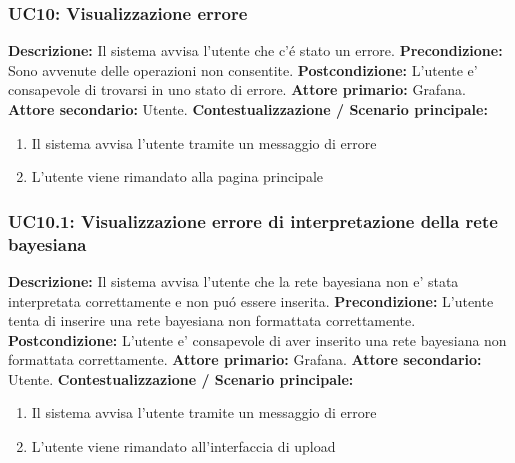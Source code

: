                 \subsubsection{UC10: Visualizzazione errore}
                    \textbf{Descrizione:}  Il sistema avvisa l’utente che c’é stato un errore.
                    \newline
                    \textbf{Precondizione:} Sono avvenute delle operazioni non consentite.
                    \newline
                    \textbf{Postcondizione:} L’utente e’ consapevole di trovarsi in uno stato di errore.
                    \newline
                    \textbf{Attore primario:} Grafana.
                    \newline
                    \textbf{Attore secondario:} Utente.
                    \newline
                    \textbf{Contestualizzazione / Scenario principale:} \begin{enumerate}
                            \item Il sistema avvisa l’utente tramite un messaggio di errore
                            \item L’utente viene rimandato alla pagina principale
                        \end{enumerate}
                        
                \subsubsection{UC10.1: Visualizzazione errore di interpretazione della rete bayesiana}
                    \textbf{Descrizione:}  Il sistema avvisa l’utente che la rete bayesiana non e’ stata interpretata correttamente e non puó essere inserita.
                    \newline
                    \textbf{Precondizione:} L’utente tenta di inserire una rete bayesiana non formattata correttamente.
                    \newline
                    \textbf{Postcondizione:} L’utente e’ consapevole di aver inserito una rete bayesiana non formattata correttamente.
                    \newline
                    \textbf{Attore primario:} Grafana.
                    \newline
                    \textbf{Attore secondario:} Utente.
                    \newline
                    \textbf{Contestualizzazione / Scenario principale:} \begin{enumerate}
                            \item Il sistema avvisa l’utente tramite un messaggio di errore
                            \item L’utente viene rimandato all’interfaccia di upload
                        \end{enumerate}
                
